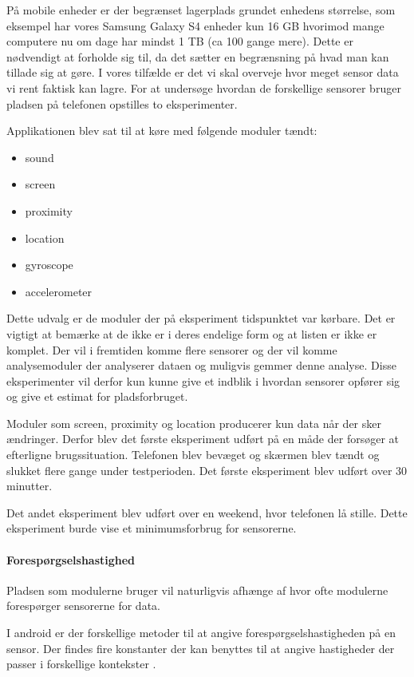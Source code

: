 På mobile enheder er der begrænset lagerplads grundet enhedens størrelse, som eksempel har vores Samsung Galaxy S4 enheder kun 16 GB hvorimod mange computere nu om dage har mindst 1 TB (ca 100 gange mere).
Dette er nødvendigt at forholde sig til, da det sætter en begrænsning på hvad man kan tillade sig at gøre.
I vores tilfælde er det vi skal overveje hvor meget sensor data vi rent faktisk kan lagre.
For at undersøge hvordan de forskellige sensorer bruger pladsen på telefonen opstilles to eksperimenter.

Applikationen blev sat til at køre med følgende moduler tændt:
\begin{itemize}
	\item sound
	\item screen
	\item proximity
	\item location
	\item gyroscope
	\item accelerometer
\end{itemize}

Dette udvalg er de moduler der på eksperiment tidspunktet var kørbare.
Det er vigtigt at bemærke at de ikke er i deres endelige form og at listen er ikke er komplet.
Der vil i fremtiden komme flere sensorer og der vil komme analysemoduler der analyserer dataen og muligvis gemmer denne analyse.
Disse eksperimenter vil derfor kun kunne give et indblik i hvordan sensorer opfører sig og give et estimat for pladsforbruget.

Moduler som screen, proximity og location producerer kun data når der sker ændringer. 
Derfor blev det første eksperiment udført på en måde der forsøger at efterligne brugssituation. 
Telefonen blev bevæget og skærmen blev tændt og slukket flere gange under testperioden.
Det første eksperiment blev udført over 30 minutter.

Det andet eksperiment blev udført over en weekend, hvor telefonen lå stille.
Dette eksperiment burde vise et minimumsforbrug for sensorerne.

\paragraph{Forespørgselshastighed}
Pladsen som modulerne bruger vil naturligvis afhænge af hvor ofte modulerne forespørger sensorerne for data.

I android er der forskellige metoder til at angive forespørgselshastigheden på en sensor.
Der findes fire konstanter der kan benyttes til at angive hastigheder der passer i forskellige kontekster \cite{sensormonitor}.

